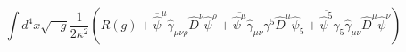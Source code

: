 \begin{equation}
\int d^4x \sqrt{-g} \frac{1}{2\kappa^2}(R(g)+\overline{\hat \psi}^\mu\hat
\gamma_{\mu\nu\rho}\hat D^{\nu}\hat\psi^{\rho}+\overline{\hat \psi^\mu}\hat
\gamma_{\mu\nu}\gamma^5\hat D^{\mu} \hat\psi_5 +\overline{\hat \psi^5}\gamma_5\hat
\gamma_{\mu\nu}\hat D^{\mu} \hat\psi^\nu) 
\end{equation}

